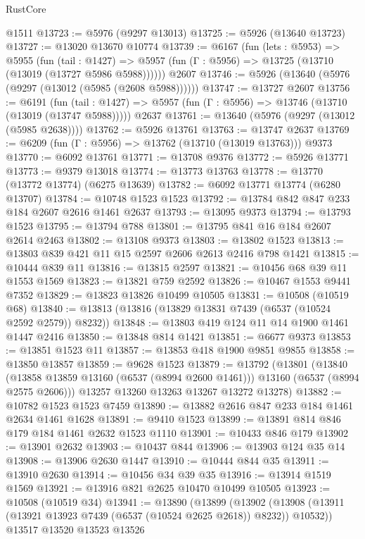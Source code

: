 \begin{lexlean}{RustCore}
\begin{coremodule}
    @1511
@13723 := @5976 (@9297 @13013)
@13725 := @5926 (@13640 @13723)
@13727 := @13020 @13670 @10774
@13739 := @6167
    (fun (lets : @5953) =>
    @5955
      (fun (tail : @1427) =>
      @5957 (fun (Γ : @5956) => @13725 (@13710 (@13019 (@13727 @5986 @5988))))))
    @2607
@13746 := @5926 (@13640 (@5976 (@9297 (@13012 (@5985 (@2608 @5988))))))
@13747 := @13727 @2607
@13756 := @6191
    (fun (tail : @1427) => @5957 (fun (Γ : @5956) => @13746 (@13710 (@13019 (@13747 @5988)))))
    @2637
@13761 := @13640 (@5976 (@9297 (@13012 (@5985 @2638))))
@13762 := @5926 @13761
@13763 := @13747 @2637
@13769 := @6209 (fun (Γ : @5956) => @13762 (@13710 (@13019 @13763))) @9373
@13770 := @6092 @13761
@13771 := @13708 @9376
@13772 := @5926 @13771
@13773 := @9379 @13018
@13774 := @13773 @13763
@13778 := @13770 (@13772 @13774) (@6275 @13639)
@13782 := @6092 @13771 @13774 (@6280 @13707)
@13784 := @10748 @1523 @1523
@13792 := @13784 @842 @847 @233 @184 @2607 @2616 @1461 @2637
@13793 := @13095 @9373
@13794 := @13793 @1523
@13795 := @13794 @788
@13801 := @13795 @841 @16 @184 @2607 @2614 @2463
@13802 := @13108 @9373
@13803 := @13802 @1523
@13813 := @13803 @839 @421 @11 @15 @2597 @2606 @2613 @2416 @798 @1421
@13815 := @10444 @839 @11
@13816 := @13815 @2597
@13821 := @10456 @68 @39 @11 @1553 @1569
@13823 := @13821 @759 @2592
@13826 := @10467 @1553 @9441 @7352
@13829 := @13823 @13826 @10499 @10505
@13831 := @10508 (@10519 @68)
@13840 := @13813 (@13816 (@13829 @13831 @7439 (@6537 (@10524 @2592 @2579)) @8232))
@13848 := @13803 @419 @124 @11 @14 @1900 @1461 @1447 @2416
@13850 := @13848 @814 @1421
@13851 := @6677 @9373
@13853 := @13851 @1523 @11
@13857 := @13853 @418 @1900 @9851 @9855
@13858 := @13850 @13857
@13859 := @9628 @1523
@13879 := @13792
    (@13801
      (@13840 (@13858 @13859 @13160 (@6537 (@8994 @2600 @1461))) @13160 (@6537 (@8994 @2575 @2606)))
      @13257
      @13260
      @13263
      @13267
      @13272
      @13278)
@13882 := @10782 @1523 @1523 @7459
@13890 := @13882 @2616 @847 @233 @184 @1461 @2634 @1461 @1628
@13891 := @9410 @1523
@13899 := @13891 @814 @846 @179 @184 @1461 @2632 @1523 @1110
@13901 := @10433 @846 @179
@13902 := @13901 @2632
@13903 := @10437 @844
@13906 := @13903 @124 @35 @14
@13908 := @13906 @2630 @1447
@13910 := @10444 @844 @35
@13911 := @13910 @2630
@13914 := @10456 @34 @39 @35
@13916 := @13914 @1519 @1569
@13921 := @13916 @821 @2625 @10470 @10499 @10505
@13923 := @10508 (@10519 @34)
@13941 := @13890
    (@13899
      (@13902 (@13908 (@13911 (@13921 @13923 @7439 (@6537 (@10524 @2625 @2618)) @8232)) @10532))
      @13517
      @13520
      @13523
      @13526

\end{coremodule}
\end{lexlean}
